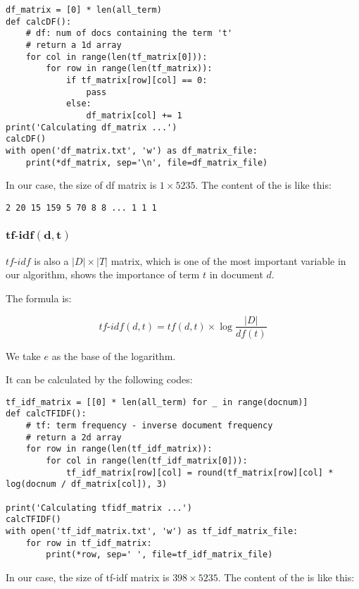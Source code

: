 \documentclass[a4paper, 12pt]{article}
\begin{document}
\begin{lstlisting}[style=myPython,caption={Calculate df matrix}]
df_matrix = [0] * len(all_term)
def calcDF():
    # df: num of docs containing the term 't'
    # return a 1d array
    for col in range(len(tf_matrix[0])):
        for row in range(len(tf_matrix)):
            if tf_matrix[row][col] == 0:
                pass
            else:
                df_matrix[col] += 1
print('Calculating df_matrix ...')
calcDF()
with open('df_matrix.txt', 'w') as df_matrix_file:
    print(*df_matrix, sep='\n', file=df_matrix_file)
\end{lstlisting}

In our case, the size of df matrix is $1 \times 5235$. The content of the  is like this:

\begin{lstlisting}[style=plainText,caption={df\_matrix.txt}]
2 20 15 159 5 70 8 8 ... 1 1 1
\end{lstlisting}

\subsubsection{$\bm{tf\text{-}idf(d,t)}$}
$tf\text{-}idf$ is also a $|D| \times |T|$ matrix, which is one of the most important variable in our algorithm, shows the importance of term $t$ in document $d$.

The formula is:

$$tf\text{-}idf(d,t) = tf(d,t) \times \log\frac{|D|}{df(t)}$$

We take $e$ as the base of the logarithm.

It can be calculated by the following codes:

\begin{lstlisting}[style=myPython,caption={Calculate tf-idf matrix}]
tf_idf_matrix = [[0] * len(all_term) for _ in range(docnum)]
def calcTFIDF():
    # tf: term frequency - inverse document frequency
    # return a 2d array
    for row in range(len(tf_idf_matrix)):
        for col in range(len(tf_idf_matrix[0])):
            tf_idf_matrix[row][col] = round(tf_matrix[row][col] * log(docnum / df_matrix[col]), 3)
    
print('Calculating tfidf_matrix ...')
calcTFIDF()
with open('tf_idf_matrix.txt', 'w') as tf_idf_matrix_file:
    for row in tf_idf_matrix:
        print(*row, sep=' ', file=tf_idf_matrix_file)
\end{lstlisting}

In our case, the size of tf-idf matrix is $398 \times 5235$. The content of the  is like this:
\end{document}
